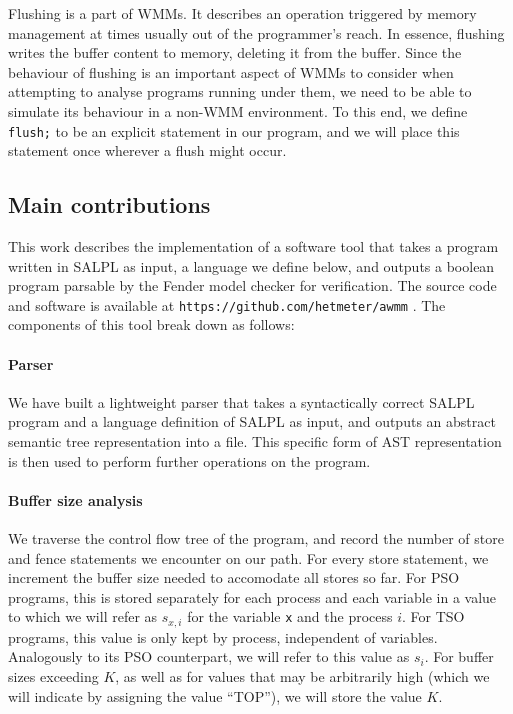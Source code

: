 Flushing is a part of WMMs. It describes an operation triggered by memory management at times usually out of the programmer's reach. In essence, flushing writes the buffer content to memory, deleting it from the buffer. Since the behaviour of flushing is an important aspect of WMMs to consider when attempting to analyse programs running under them, we need to be able to simulate its behaviour in a non-WMM environment. To this end, we define \lstinline$flush;$ to be an explicit statement in our program, and we will place this statement once wherever a flush might occur.

\subsection{Main contributions}

This work describes the implementation of a software tool that takes a program written in SALPL as input, a language we define below, and outputs a boolean program parsable by the Fender \cite{fender} model checker for verification. The source code and software is available at \lstinline{https://github.com/hetmeter/awmm} . The components of this tool break down as follows:

\paragraph{Parser}

We have built a lightweight parser that takes a syntactically correct SALPL program and a language definition of SALPL as input, and outputs an abstract semantic tree representation into a file. This specific form of AST representation is then used to perform further operations on the program.

\paragraph{Buffer size analysis}

We traverse the control flow tree of the program, and record the number of store and fence statements we encounter on our path. For every store statement, we increment the buffer size needed to accomodate all stores so far. For PSO programs, this is stored separately for each process and each variable in a value to which we will refer as $s_{x, i}$ for the variable \lstinline$x$ and the process $i$. For TSO programs, this value is only kept by process, independent of variables. Analogously to its PSO counterpart, we will refer to this value as $s_i$. For buffer sizes exceeding $K$, as well as for values that may be arbitrarily high (which we will indicate by assigning the value ``TOP''), we will store the value $K$.

